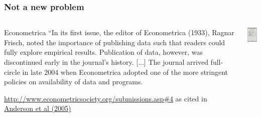 \begin{frame}
	\frametitle{Not a new problem}
	\begin{columns}
		\begin{column}{.7\textwidth}
			\begin{block}{Econometrica}
				``In its first issue, the editor of Econometrica (1933), Ragnar Frisch, noted
				the importance of publishing data such that readers could fully explore
				empirical results.  Publication of data, however, was discontinued early in
				the journal's history.  [...]  The journal arrived full-circle in late 2004 when Econometrica
				adopted one of the more stringent policies on availability of data and
				programs.
			\end{block}
			\tiny \href{http://www.econometricsociety.org/submissions.asp\#4}{http://www.econometricsociety.org/submissions.asp\#4} as cited in \href{http://research.stlouisfed.org/wp/2005/2005-014.pdf}{Anderson et al (2005)}
		\end{column}
		\begin{column}{.3\textwidth}
			\href{http://www.jstor.org/stable/i332704}{\includegraphics[width=\textwidth]{econometrica-vol1.png}}
		\end{column}
	\end{columns}
\end{frame}

